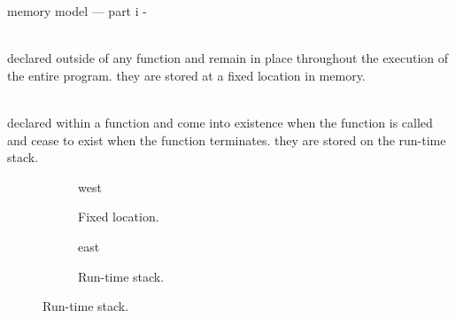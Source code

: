\documentclass[10pt,t,svgnames]{beamer}
\makeatletter
\newlength\tightleftmargin{}
\newlength\diffleftmargin{}
\providecommand{\nextline}{
  \setlength\labelwidth{\tightleftmargin}
  \setlength\leftmargin{\tightleftmargin}
  \advance\linewidth\diffleftmargin{}
  \advance\@totalleftmargin-\diffleftmargin{}
  \parshape\@ne\@totalleftmargin\linewidth{}
  \setlength\itemsep{1.5ex}
}
\let\origdescription\description
\let\endorigdescription\enddescription
\renewenvironment{description}{\origdescription\nextline}{\endorigdescription}
\makeatother
\begin{document}
  \begin{frame}{memory model --- part i}
    \begin{description}
      \item[global variables] \hfill \\ declared outside of any function and
        remain in place throughout the execution of the entire program. they are
        stored at a fixed location in memory.
      \item[local variables] \hfill \\ declared within a function and come into
        existence when the function is called and cease to exist when the
        function terminates. they are stored on the run-time stack.
    \end{description}

    \vspace{1\baselineskip}

    \begin{figure}
      \centering
      \begin{subfigure}[b]{.30\textwidth}
        \centering
        \begin{tikzstack}[bg]
          \begin{stack}{west}
          \end{stack}
        \end{tikzstack}
        \caption{Fixed location.}
      \end{subfigure}
      \quad
      \begin{subfigure}[b]{.30\textwidth}
        \centering
        \begin{tikzstack}[fg]
          \begin{stack}{east}
          \end{stack}
        \end{tikzstack}
        \caption{Run-time stack.}
      \end{subfigure}
    \end{figure}

  \end{frame}
\end{document}
